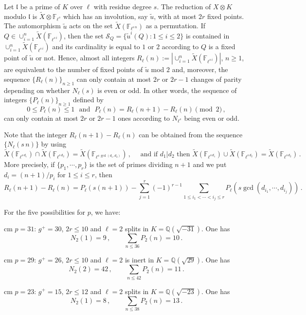\documentclass[a4paper,12pt]{article}
\theoremstyle{definition}
\theoremstyle{remark}
\numberwithin{equation}{section}
\newcommand{\Q}{\mathbb{Q}}
\newcommand{\F}{\mathbb{F}}
\newcommand{\gl}{\mathfrak l}
\newcommand{\cS}{{\mathcal S}}
\begin{document}
Let $\gl$ be a prime of $K$ over $\ell$ with residue degree $s$. The reduction of $X\otimes K$ modulo $\gl$ is $\widetilde X\otimes \F_{\ell^s}$ which has an involution, say $\widetilde u$, with at most $2r$ fixed points.  The automorphism $\widetilde u$ acts on the set $\widetilde{X}(\F_{\ell^{s\, n}})$ as a permutation. If  $Q\in \cup_{i=1}^n\widetilde X(\F_{\ell^{ s\,i}})$, then the set $\cS_Q=\{ \widetilde{u}^i(Q)\colon 1\leq i \leq 2\}$ is contained in $ \cup_{i=1}^n\widetilde  X(\F_{\ell^{ s\,i}})$ and its  cardinality  is equal to $1$ or $2$ according to $Q$ is a fixed point of  $\widetilde u$ or not. Hence,    almost all integers  $R_{\ell}(n):=|\cup_{i=1}^n\widetilde  X(\F_{\ell^{ s\,i}})|$, $n\geq 1$,  are equivalent to the number of fixed points of $\widetilde{u}$ mod $2$
 and, moreover, the sequence $\{R_\ell (n)\}_{n\geq 1}$    can only contain at  most   $2r$ or $2r-1$ changes of parity  depending on whether $N_{\ell}(s)$ is even or odd. In other words, the sequence of integers  $\{ P_\ell(n)\}_{n\geq 1}$ defined by
$$0\leq P_\ell (n)\leq 1\,\,\text{ and }\,\,  P_{\ell}(n)=R_{\ell}(n+1)-R_{\ell}(n)\pmod 2\,,$$
can only contain at most $2r$ or $2r-1$ ones according to  $N_{\ell^s}$ being even or odd.

Note that the integer  $R_{\ell}(n+1)-R_{\ell}(n)$ can be obtained from the sequence $\{ N_\ell (s\, n)\}$
by using
$$\widetilde X (\F_{\ell ^{s\,d_1}})\cap \widetilde X(\F_{\ell ^{s\, d_2}})=\widetilde X (\F_{\ell ^{s\,\gcd(d_1,d_2)}})\,,\quad\text{ and if }
d_1|d_2 \text{ then }\widetilde X (\F_{\ell ^{s\,d_1}})\cup \widetilde X (\F_{\ell ^{s\,d_2}})=\widetilde X(\F_{\ell^{s\,d_2}})\,.
$$
More precisely, if $\{p_1,\cdots,p_r\}$ is the set of primes dividing $n+1$ and we put $d_i=(n+1)/p_i$ for $1\leq i\leq r$, then
$$
R_{\ell}(n+1)-R_{\ell}(n)= P_\ell (s(n+1))-\sum_ {j=1}^r (-1)^{r-1} \sum_{1\leq i_1<\cdots<i_j\leq r} P_\ell (s \gcd(d_{i_1},\cdots,d_{i_j}))\,.$$


For the five possibilities for $p$, we have:

 cm
{ $p=31$:}  $g^+=30$,   $2r\leq 10$ and   $\ell=2$  splits in $K=\Q(\sqrt{-31})$. One has
$$
N_2(1)=9\,,\qquad  \sum_{n\leq 36}P_2(n)=10\,.
$$

 cm
{$p=29$:} $g^+=26$,  $2r\leq 10$ and  $\ell=2$ is inert in $K=\Q(\sqrt{29})$. One has
$$
N_2(2)=42\,,\qquad  \sum_{n\leq 42}P_2(n)=11\,.
$$

 cm
{ $p=23$:}  $g^+=15$,   $2r\leq 12$ and  $\ell=2$  splits in $K=\Q(\sqrt{-23})$. One has
$$
N_2(1)=8\,,\qquad \sum_{n\leq 38}P_2(n)=13\,.
$$
\end{document}
